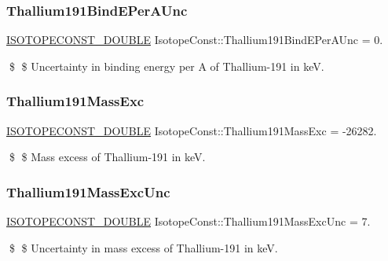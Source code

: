 \subsubsection{\texorpdfstring{Thallium191\+Bind\+E\+Per\+A\+Unc}{Thallium191BindEPerAUnc}}
{\footnotesize\ttfamily \mbox{\hyperlink{group___isotope_const-_macros_ga8f45a7272ce02c0b4c65c44636ed719a}{I\+S\+O\+T\+O\+P\+E\+C\+O\+N\+S\+T\+\_\+\+D\+O\+U\+B\+LE}} Isotope\+Const\+::\+Thallium191\+Bind\+E\+Per\+A\+Unc = 0.}

\$ \$ Uncertainty in binding energy per A of Thallium-\/191 in keV. \mbox{\label{group___isotope_const-_thallium-_tl191_gad7d07fe5230c2d7dcb23c33941e902bc}} 
\subsubsection{\texorpdfstring{Thallium191\+Mass\+Exc}{Thallium191MassExc}}
{\footnotesize\ttfamily \mbox{\hyperlink{group___isotope_const-_macros_ga8f45a7272ce02c0b4c65c44636ed719a}{I\+S\+O\+T\+O\+P\+E\+C\+O\+N\+S\+T\+\_\+\+D\+O\+U\+B\+LE}} Isotope\+Const\+::\+Thallium191\+Mass\+Exc = -\/26282.}

\$ \$ Mass excess of Thallium-\/191 in keV. \mbox{\label{group___isotope_const-_thallium-_tl191_ga54c926a0c6bd13c0f5254ec934495548}} 
\subsubsection{\texorpdfstring{Thallium191\+Mass\+Exc\+Unc}{Thallium191MassExcUnc}}
{\footnotesize\ttfamily \mbox{\hyperlink{group___isotope_const-_macros_ga8f45a7272ce02c0b4c65c44636ed719a}{I\+S\+O\+T\+O\+P\+E\+C\+O\+N\+S\+T\+\_\+\+D\+O\+U\+B\+LE}} Isotope\+Const\+::\+Thallium191\+Mass\+Exc\+Unc = 7.}

\$ \$ Uncertainty in mass excess of Thallium-\/191 in keV. \mbox{\label{group___isotope_const-_thallium-_tl191_ga5b116440c29dc2a79ceaea8ba0f21f77}} 
